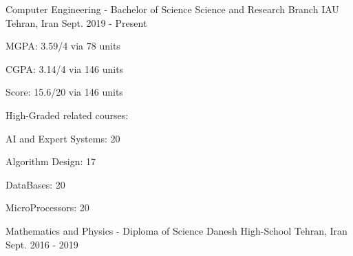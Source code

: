 


\begin{cventries}

\cventry
{Computer Engineering - Bachelor of Science}
{Science and Research Branch IAU}
{Tehran, Iran}
{Sept. 2019 - Present}
{ %
\begin{cvitems}
\item {MGPA: 3.59/4 via 78 units}
\item {CGPA: 3.14/4 via 146 units}
\item {Score: 15.6/20 via 146 units}
\item {High-Graded related courses:}
\begin{cvitems}
\item {\fontsize{11}{12}\selectfont AI and Expert Systems: 20}
\item {\fontsize{11}{12}\selectfont Algorithm Design: 17}
\item {\fontsize{11}{12}\selectfont DataBases: 20}
\item {\fontsize{11}{12}\selectfont MicroProcessors: 20}
\end{cvitems}
\end{cvitems}
}
\cventry
{Mathematics and Physics - Diploma of Science} %
{Danesh High-School} %
{Tehran, Iran} %
{Sept. 2016 - 2019} %
{%
}


\end{cventries}